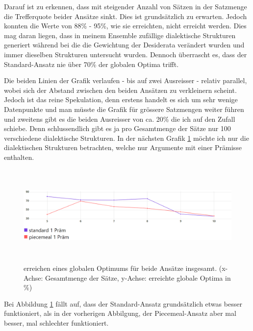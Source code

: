 \documentclass{article}
\begin{document}
Darauf ist zu erkennen, dass mit steigender Anzahl von Sätzen in der Satzmenge die Trefferquote beider Ansätze sinkt. Dies ist grundsätzlich zu erwarten. Jedoch konnten die Werte von 88\% - 95\%, wie sie \autocite[S.~455]{beisbart_making_2021} erreichten, nicht erreicht werden. Dies mag daran liegen, dass in meinem Ensemble zufällige dialektische Strukturen generiert während bei \autocite{beisbart_making_2021} die die Gewichtung der Desiderata verändert wurden und immer dieselben Strukturen untersucht wurden. Dennoch überrascht es, dass der Standard-Ansatz nie über 70\% der globalen Optima trifft.

Die beiden Linien der Grafik verlaufen - bis auf zwei Ausreisser - relativ parallel, wobei sich der Abstand zwischen den beiden Ansätzen zu verkleinern scheint. Jedoch ist das reine Spekulation, denn erstens handelt es sich um sehr wenige Datenpunkte und man müsste die Grafik für grössere Satzmengen weiter führen und zweitens gibt es die beiden Ausreisser von ca. 20\% die ich auf den Zufall schiebe. Denn schlussendlich gibt es ja pro Gesamtmenge der Sätze nur 100 verschiedene dialektische Strukturen. In der nächsten Grafik \ref{fig:GlobOptPoolsizeLineOnePrem} möchte ich nur die dialektischen Strukturen betrachten, welche nur Argumente mit einer Prämisse enthalten.

\begin{figure}[t]
  \centering
  \includegraphics[width=\textwidth,height=5cm,keepaspectratio]{images/global_optima_standard_piecemeal_1prem.png}
  \caption{erreichen eines globalen Optimums für beide Ansätze insgesamt. (x-Achse: Gesamtmenge der Sätze, y-Achse: erreichte globale Optima in \%) \label{fig:GlobOptPoolsizeLineOnePrem}}
\end{figure}

Bei Abbildung \ref{fig:GlobOptPoolsizeLineOnePrem} fällt auf, dass der Standard-Ansatz grundsätzlich etwas besser funktioniert, als in der vorherigen Abbilgung, der Piecemeal-Ansatz aber mal besser, mal schlechter funktioniert.
\end{document}
